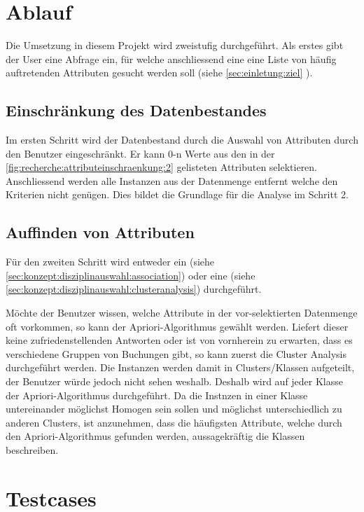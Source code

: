 
\section{Ablauf}
Die Umsetzung in diesem Projekt wird zweistufig durchgeführt. Als erstes gibt der User eine Abfrage ein, für welche anschliessend eine eine Liste von häufig auftretenden Attributen gesucht werden soll (siehe \cref{sec:einletung:ziel} ).


\subsection{Einschränkung des Datenbestandes}
Im ersten Schritt wird der Datenbestand durch die Auswahl von Attributen durch den Benutzer eingeschränkt. Er kann 0-n Werte aus den in der \cref{fig:recherche:attributeinschraenkung:2} gelisteten Attributen selektieren. Anschliessend werden alle Instanzen aus der Datenmenge entfernt welche den Kriterien nicht genügen. Dies bildet die Grundlage für die Analyse im Schritt 2.

\subsection{Auffinden von Attributen}
Für den zweiten Schritt wird entweder ein  (siehe \cref{sec:konzept:disziplinauswahl:association}) oder eine  (siehe \cref{sec:konzept:disziplinauswahl:clusteranalysis}) durchgeführt. 

Möchte der Benutzer wissen, welche Attribute in der vor-selektierten Datenmenge oft vorkommen, so kann der Apriori-Algorithmus gewählt werden. Liefert dieser keine zufriedenstellenden Antworten oder ist von vornherein zu erwarten, dass es verschiedene Gruppen von Buchungen gibt, so kann zuerst die Cluster Analysis durchgeführt werden. Die Instanzen werden damit in Clusters/Klassen aufgeteilt, der Benutzer würde jedoch nicht sehen weshalb. Deshalb wird auf jeder Klasse der Apriori-Algorithmus durchgeführt. Da die Instnzen in einer Klasse untereinander möglichst Homogen sein sollen und möglichst unterschiedlich zu anderen Clusters, ist anzunehmen, dass die häufigsten Attribute, welche durch den Apriori-Algorithmus gefunden werden, aussagekräftig die Klassen beschreiben.


\section{Testcases}
\label{sec:recherche:testcases}
